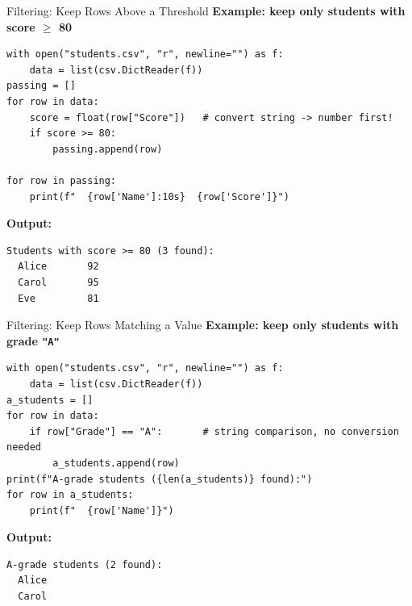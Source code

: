 \documentclass{csbeamer}
\begin{document}
\begin{frame}[fragile]{Filtering: Keep Rows Above a Threshold}
    \textbf{Example: keep only students with score $\geq$ 80}

    \begin{lstlisting}
with open("students.csv", "r", newline="") as f:
    data = list(csv.DictReader(f))
passing = []
for row in data:
    score = float(row["Score"])   # convert string -> number first!
    if score >= 80:
        passing.append(row)

for row in passing:
    print(f"  {row['Name']:10s}  {row['Score']}")
    \end{lstlisting}

    \pause
    \textbf{Output:}
    \begin{lstlisting}
Students with score >= 80 (3 found):
  Alice       92
  Carol       95
  Eve         81
    \end{lstlisting}
\end{frame}

\begin{frame}[fragile]{Filtering: Keep Rows Matching a Value}
    \textbf{Example: keep only students with grade \texttt{"A"}}

    \begin{lstlisting}
with open("students.csv", "r", newline="") as f:
    data = list(csv.DictReader(f))
a_students = []
for row in data:
    if row["Grade"] == "A":       # string comparison, no conversion needed
        a_students.append(row)
print(f"A-grade students ({len(a_students)} found):")
for row in a_students:
    print(f"  {row['Name']}")
    \end{lstlisting}

    \pause

    \textbf{Output:}
    \begin{lstlisting}
A-grade students (2 found):
  Alice
  Carol
    \end{lstlisting}
\end{frame}
\end{document}
